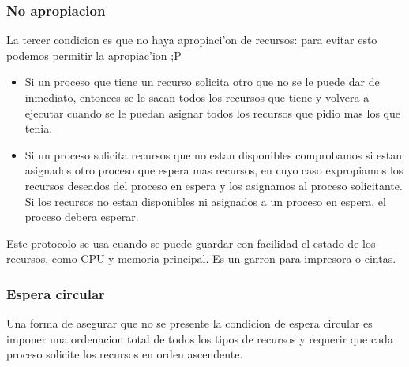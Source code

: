 \documentclass[a4paper,10pt]{article}
\begin{document}
\subsubsection{No apropiacion}
La tercer condicion es que no haya apropiaci'on de recursos: para evitar esto podemos permitir la apropiac'ion ;P
\begin{itemize}
 \item Si un proceso que tiene un recurso solicita otro que no se le puede dar de inmediato, entonces se le sacan todos los recursos que tiene y volvera a ejecutar cuando se le puedan asignar todos los recursos que pidio mas los que tenia.
 \item Si un proceso solicita recursos que no estan disponibles comprobamos si estan asignados otro proceso que espera mas recursos, en cuyo caso expropiamos los recursos deseados del proceso en espera y los asignamos al proceso solicitante. Si los recursos no estan disponibles ni asignados a un proceso en espera, el proceso debera esperar.
\end{itemize}
Este protocolo se usa cuando se puede guardar con facilidad el estado de los recursos, como CPU y memoria principal. Es un garron para impresora o cintas.

\subsubsection{Espera circular}
Una forma de asegurar que no se presente la condicion de espera circular es imponer una ordenacion total de todos los tipos de recursos y requerir que cada proceso solicite los recursos en orden ascendente.
\end{document}
